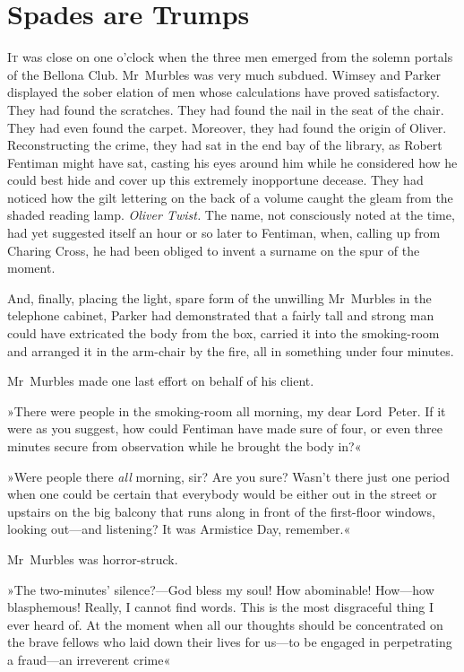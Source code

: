 \chapter{Spades are Trumps}
\lettrine[lines=4]{I}{t} was close on one o'clock when the three men emerged from the solemn portals of the Bellona Club. Mr~Murbles was very much subdued. Wimsey and Parker displayed the sober elation of men whose calculations have proved satisfactory. They had found the scratches. They had found the nail in the seat of the chair. They had even found the carpet. Moreover, they had found the origin of Oliver. Reconstructing the crime, they had sat in the end bay of the library, as Robert Fentiman might have sat, casting his eyes around him while he considered how he could best hide and cover up this extremely inopportune decease. They had noticed how the gilt lettering on the back of a volume caught the gleam from the shaded reading lamp. \textit{Oliver Twist.} The name, not consciously noted at the time, had yet suggested itself an hour or so later to Fentiman, when, calling up from Charing Cross, he had been obliged to invent a surname on the spur of the moment.

And, finally, placing the light, spare form of the unwilling Mr~Murbles in the telephone cabinet, Parker had demonstrated that a fairly tall and strong man could have extricated the body from the box, carried it into the smoking-room and arranged it in the arm-chair by the fire, all in something under four minutes.

Mr~Murbles made one last effort on behalf of his client.

»There were people in the smoking-room all morning, my dear Lord~Peter. If it were as you suggest, how could Fentiman have made sure of four, or even three minutes secure from observation while he brought the body in?«

»Were people there \textit{all} morning, sir? Are you sure? Wasn't there just one period when one could be certain that everybody would be either out in the street or upstairs on the big balcony that runs along in front of the first-floor windows, looking out—and listening? It was Armistice Day, remember.«

Mr~Murbles was horror-struck.

»The two-minutes' silence?—God bless my soul! How abominable! How—how blasphemous! Really, I cannot find words. This is the most disgraceful thing I ever heard of. At the moment when all our thoughts should be concentrated on the brave fellows who laid down their lives for us—to be engaged in perpetrating a fraud—an irreverent crime\longdash«

